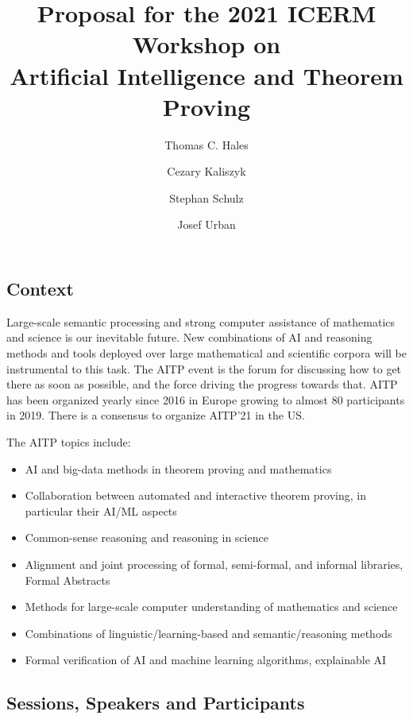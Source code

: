 \documentclass[12pt]{article}
\title{Proposal for the 2021 ICERM Workshop on \\ Artificial Intelligence and Theorem Proving }
\author{Thomas C. Hales \and Cezary Kaliszyk \and Stephan Schulz \and Josef Urban}
\begin{document}
\maketitle





\subsection*{Context}

Large-scale semantic processing and strong computer assistance of
mathematics and science is our inevitable future. New combinations of
AI and reasoning methods and tools deployed over large mathematical
and scientific corpora will be instrumental to this task.  The AITP
event is the forum for discussing how to get there as soon as
possible, and the force driving the progress towards that. AITP has
been organized yearly since 2016 in Europe growing to almost 80
participants in 2019. There is a consensus to organize AITP'21 in the
US.

The AITP topics include:
\begin{itemize}
\item AI and big-data methods in theorem proving and mathematics
\item Collaboration between automated and interactive theorem proving, in particular their AI/ML aspects
\item Common-sense reasoning and reasoning in science
\item Alignment and joint processing of formal, semi-formal, and informal libraries, Formal Abstracts
\item Methods for large-scale computer understanding of mathematics and science
\item Combinations of linguistic/learning-based and semantic/reasoning methods 
\item Formal verification of AI and machine learning algorithms, explainable AI 
\end{itemize}

\subsection*{Sessions, Speakers and Participants}
\end{document}
